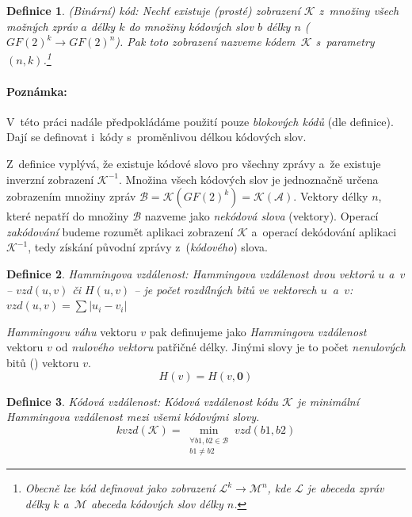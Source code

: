 \documentclass[thesis=M,czech,hidelinks]{FITthesis}[2012/06/26]
\newcommand{\0}{{\textcolor[gray]{0.75}{0}}}
\newtheorem{definice}{Definice}
\begin{document}
\begin{definice}{(Binární) kód:}
    Nechť existuje (prosté) zobrazení $\mathcal{K}$ z~množiny všech možných
    zpráv $a$ délky $k$ do množiny kódových slov $b$ délky $n$
    ($GF(2)^k \rightarrow GF(2)^n$). Pak toto zobrazení nazveme
    kódem~$\mathcal{K}$ s~parametry $(n,k)$.\footnote{
        Obecně lze \emph{kód} definovat jako zobrazení $\mathcal{L}^k
        \rightarrow \mathcal{M}^n$, kde $\mathcal{L}$ je \emph{abeceda} zpráv
        délky $k$ a~$\mathcal{M}$ abeceda kódových slov délky $n$.
    }
\end{definice}

\paragraph{Poznámka:} V~této práci nadále předpokládáme použití pouze
\emph{blokových kódů} (dle definice). Dají se definovat i~kódy s~proměnlivou
délkou kódových slov.

Z~definice vyplývá, že existuje kódové slovo pro všechny zprávy a~že existuje
inverzní zobrazení $\mathcal{K}^{-1}$. Množina všech kódových slov je
jednoznačně určena zobrazením množiny zpráv $\mathcal{B} =
\mathcal{K}(GF(2)^k) = \mathcal{K}(\mathcal{A})$. Vektory délky $n$, které
nepatří do množiny $\mathcal{B}$ nazveme jako \emph{nekódová slova} (vektory).
Operací \emph{zakódování} budeme rozumět aplikaci zobrazení $\mathcal{K}$
a~operací dekódování aplikaci $\mathcal{K}^{-1}$, tedy získání původní zprávy
z~(\emph{kódového}) slova.

\begin{definice}{Hammingova vzdálenost:}
    \emph{Hammingova vzdálenost} dvou vektorů $u$ a~$v$ -- $vzd(u,v)$ či
    $H(u,v)$ -- je počet rozdílných \emph{bitů} ve vektorech $u$~a~$v$:
    $vzd(u,v) = \sum \left| u_i - v_i \right|$
\end{definice}

\emph{Hammingovu váhu} vektoru $v$ pak definujeme jako \emph{Hammingovu
vzdálenost} vektoru $v$ od \emph{nulového vektoru} patřičné délky. Jinými slovy
je to počet \emph{nenulových} bitů () vektoru $v$.
$$ H(v) = H(v,\mathbf{0}) $$


\begin{definice}{Kódová vzdálenost:}
    Kódová vzdálenost kódu $\mathcal{K}$ je minimální \emph{Hammingova
    vzdálenost} mezi všemi kódovými slovy.
    $$
        kvzd(\mathcal{K}) =
        \min_{\substack{\forall b1,b2 \in \mathcal{B} \\ b1 \neq b2}} vzd(b1,b2)
    $$
\end{definice}
\end{document}
